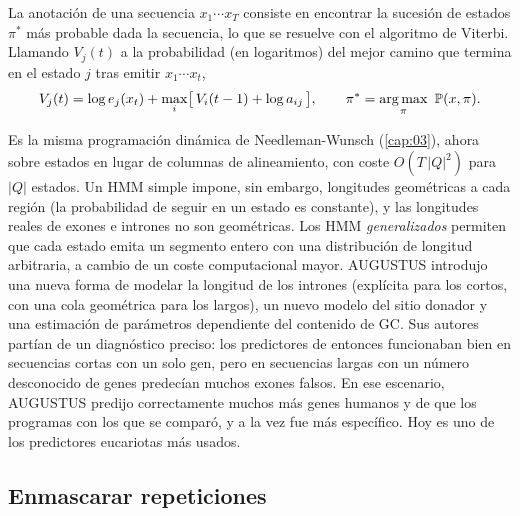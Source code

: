 La anotación de una secuencia $x_1\cdots x_T$ consiste en encontrar la sucesión de estados $\pi^\ast$ más probable dada la secuencia, lo que se resuelve con el algoritmo de Viterbi. Llamando $V_j(t)$ a la probabilidad (en logaritmos) del mejor camino que termina en el estado $j$ tras emitir $x_1\cdots x_t$,
\begin{equation}\label{eq:08-viterbi}
V_j(t) = \log e_j(x_t) + \max_{i}\bigl[\,V_i(t-1) + \log a_{ij}\,\bigr],
\qquad
\pi^\ast = \operatorname*{arg\,max}_{\pi}\ \mathbb{P}(x,\pi).
\end{equation}

\begin{simbolos}
\end{simbolos}

Es la misma programación dinámica de Needleman-Wunsch (\cref{cap:03}), ahora sobre estados en lugar de columnas de alineamiento, con coste $O(T\,|Q|^2)$ para $|Q|$ estados. Un HMM simple impone, sin embargo, longitudes geométricas a cada región (la probabilidad de seguir en un estado es constante), y las longitudes reales de exones e intrones no son geométricas. Los HMM \emph{generalizados} permiten que cada estado emita un segmento entero con una distribución de longitud arbitraria, a cambio de un coste computacional mayor. AUGUSTUS \parencite{c08-stanke2003} introdujo una nueva forma de modelar la longitud de los intrones (explícita para los cortos, con una cola geométrica para los largos), un nuevo modelo del sitio donador y una estimación de parámetros dependiente del contenido de GC. Sus autores partían de un diagnóstico preciso: los predictores de entonces funcionaban bien en secuencias cortas con un solo gen, pero en secuencias largas con un número desconocido de genes predecían muchos exones falsos. En ese escenario, AUGUSTUS predijo correctamente muchos más genes humanos y de  que los programas con los que se comparó, y a la vez fue más específico. Hoy es uno de los predictores eucariotas más usados.

\subsection{Enmascarar repeticiones}

